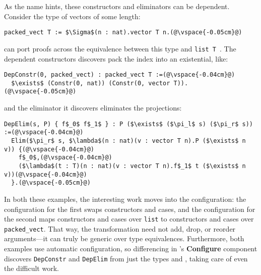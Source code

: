 As the name hints, these constructors and eliminators can be dependent.
Consider the type of vectors of some length:

\begin{lstlisting}
packed_vect T := $\Sigma$(n : nat).vector T n.(@\vspace{-0.05cm}@)
\end{lstlisting}
\toolnamec can port proofs across the equivalence between this type and \lstinline{list T}~\href{https://github.com/uwplse/pumpkin-pi/blob/v2.0.0/plugin/coq/examples/Example.v}{}. %
The dependent constructors \toolnamec discovers pack the index into an existential, like:

\begin{lstlisting}
DepConstr(0, packed_vect) : packed_vect T :=(@\vspace{-0.04cm}@)
  $\exists$ (Constr(0, nat)) (Constr(0, vector T)).(@\vspace{-0.05cm}@)
\end{lstlisting}
and the eliminator it discovers eliminates the projections:

\begin{lstlisting}
DepElim(s, P) { f$_0$ f$_1$ } : P ($\exists$ ($\pi_l$ s) ($\pi_r$ s)) :=(@\vspace{-0.04cm}@)
  Elim($\pi_r$ s, $\lambda$(n : nat)(v : vector T n).P ($\exists$ n v)) {(@\vspace{-0.04cm}@)
    f$_0$,(@\vspace{-0.04cm}@)
    ($\lambda$(t : T)(n : nat)(v : vector T n).f$_1$ t ($\exists$ n v))(@\vspace{-0.04cm}@)
  }.(@\vspace{-0.05cm}@) 
\end{lstlisting}

In both these examples, the interesting work moves into the configuration:
the configuration for the first swaps constructors and cases,
and the configuration for the second maps constructors and cases over \lstinline{list} to constructors and cases over \lstinline{packed_vect}. %
That way, the transformation need not add, drop, or reorder arguments---it can truly be generic over type equivalences.
Furthermore, both examples use automatic configuration, so differencing in \toolnamec's \textbf{Configure} component
discovers \lstinline{DepConstr} and \lstinline{DepElim} from just the types \Aa and \B, taking care of even the difficult work.

